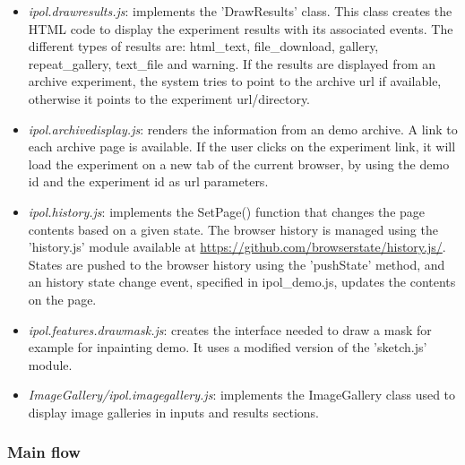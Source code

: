 \begin{itemize}
 \item \emph{ipol.drawresults.js}: implements the 'DrawResults' class. This
  class creates the HTML code to display the experiment results with its associated
  events. The different types of results are: html\_text, file\_download,
  gallery, repeat\_gallery, text\_file and warning. If the results are displayed
  from an archive experiment, the system tries to point to the archive url if
  available, otherwise it points to the experiment url/directory.


 \item \emph{ipol.archivedisplay.js}: renders the information from an demo archive.
  A link to each archive page is available. If the user clicks on the experiment
  link, it will load the experiment on a new tab of the current browser, by using
  the demo id and the experiment id as url parameters.

 \item \emph{ipol.history.js}: implements the SetPage() function that
  changes the page contents based on a given state. The browser history is 
  managed using the 'history.js' module available at 
  \url{https://github.com/browserstate/history.js/}.
  States are pushed to the browser history using the 'pushState' method, 
  and an history state change event, specified in ipol\_demo.js, updates
  the contents on the page.

 \item \emph{ipol.features.drawmask.js}: creates the interface needed to draw
  a mask for example for inpainting demo. It uses a modified version of the 'sketch.js' module.

  \item \emph{ImageGallery/ipol.imagegallery.js}: implements the ImageGallery class
  used to display image galleries in inputs and results sections.

\end{itemize}

\subsubsection{Main flow}

